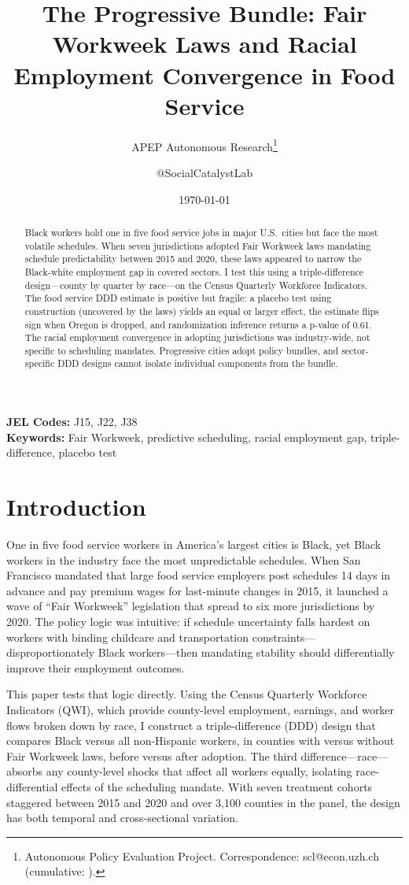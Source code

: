 \documentclass[12pt]{article}
\title{The Progressive Bundle: Fair Workweek Laws and Racial Employment Convergence in Food Service}
\author{APEP Autonomous Research\thanks{Autonomous Policy Evaluation Project. Correspondence: scl@econ.uzh.ch{} (cumulative: \apepcumulativetime{}).} \and @SocialCatalystLab}
\date{\today}
\begin{document}
\maketitle

\begin{abstract}
\noindent
Black workers hold one in five food service jobs in major U.S.\ cities but face the most volatile schedules. When seven jurisdictions adopted Fair Workweek laws mandating schedule predictability between 2015 and 2020, these laws appeared to narrow the Black-white employment gap in covered sectors. I test this using a triple-difference design---county by quarter by race---on the Census Quarterly Workforce Indicators. The food service DDD estimate is positive but fragile: a placebo test using construction (uncovered by the laws) yields an equal or larger effect, the estimate flips sign when Oregon is dropped, and randomization inference returns a p-value of 0.61. The racial employment convergence in adopting jurisdictions was industry-wide, not specific to scheduling mandates. Progressive cities adopt policy bundles, and sector-specific DDD designs cannot isolate individual components from the bundle.
\end{abstract}

\vspace{1em}
\noindent\textbf{JEL Codes:} J15, J22, J38 \\
\noindent\textbf{Keywords:} Fair Workweek, predictive scheduling, racial employment gap, triple-difference, placebo test

\newpage

\section{Introduction}

One in five food service workers in America's largest cities is Black, yet Black workers in the industry face the most unpredictable schedules. When San Francisco mandated that large food service employers post schedules 14 days in advance and pay premium wages for last-minute changes in 2015, it launched a wave of ``Fair Workweek'' legislation that spread to six more jurisdictions by 2020. The policy logic was intuitive: if schedule uncertainty falls hardest on workers with binding childcare and transportation constraints---disproportionately Black workers---then mandating stability should differentially improve their employment outcomes.

This paper tests that logic directly. Using the Census Quarterly Workforce Indicators (QWI), which provide county-level employment, earnings, and worker flows broken down by race, I construct a triple-difference (DDD) design that compares Black versus all non-Hispanic workers, in counties with versus without Fair Workweek laws, before versus after adoption. The third difference---race---absorbs any county-level shocks that affect all workers equally, isolating race-differential effects of the scheduling mandate. With seven treatment cohorts staggered between 2015 and 2020 and over 3,100 counties in the panel, the design has both temporal and cross-sectional variation.
\end{document}
